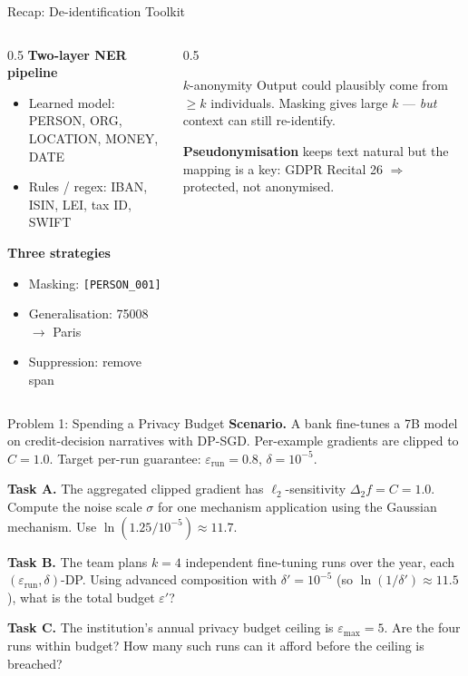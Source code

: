 \documentclass[9pt,t]{beamer}
\begin{document}
\begin{frame}{Recap: De-identification Toolkit}
\begin{columns}[T]
\begin{column}{0.5\textwidth}
\textbf{Two-layer NER pipeline}
\begin{itemize}
  \item Learned model: PERSON, ORG, LOCATION, MONEY, DATE
  \item Rules / regex: IBAN, ISIN, LEI, tax ID, SWIFT
\end{itemize}
\medskip
\textbf{Three strategies}
\begin{itemize}
  \item Masking: \texttt{[PERSON\_001]}
  \item Generalisation: 75008 $\to$ Paris
  \item Suppression: remove span
\end{itemize}
\end{column}
\begin{column}{0.5\textwidth}
\begin{block}{$k$-anonymity}
Output could plausibly come from $\geq k$ individuals. Masking gives large $k$ ---
\emph{but} context can still re-identify.
\end{block}
\medskip
\textbf{Pseudonymisation} keeps text natural but the mapping is a key: GDPR
Recital 26 $\Rightarrow$ protected, not anonymised.
\end{column}
\end{columns}
\end{frame}

\begin{frame}{Problem 1: Spending a Privacy Budget}
\textbf{Scenario.} A bank fine-tunes a 7B model on credit-decision narratives with
DP-SGD. Per-example gradients are clipped to $C = 1.0$. Target per-run guarantee:
$\varepsilon_{\text{run}} = 0.8$, $\delta = 10^{-5}$.

\medskip
\textbf{Task A.} The aggregated clipped gradient has $\ell_2$-sensitivity
$\Delta_2 f = C = 1.0$. Compute the noise scale $\sigma$ for one mechanism
application using the Gaussian mechanism. Use $\ln(1.25/10^{-5}) \approx 11.7$.

\medskip
\textbf{Task B.} The team plans $k = 4$ independent fine-tuning runs over the year,
each $(\varepsilon_{\text{run}}, \delta)$-DP. Using advanced composition with
$\delta' = 10^{-5}$ (so $\ln(1/\delta') \approx 11.5$), what is the total budget
$\varepsilon'$?

\medskip
\textbf{Task C.} The institution's annual privacy budget ceiling is
$\varepsilon_{\max} = 5$. Are the four runs within budget? How many such runs can it
afford before the ceiling is breached?
\end{frame}
\end{document}
